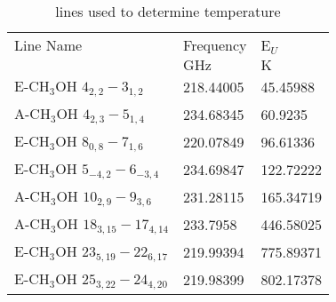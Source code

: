 \begin{table*}[htp]
\caption{\methanol lines used to determine temperature}
\begin{tabular}{lll}
\label{tab:methanol}
Line Name & Frequency & E$_U$ \\
 & $\mathrm{GHz}$ & $\mathrm{K}$ \\
\hline
E-CH$_3$OH $4_{2,2}-3_{1,2}$ & 218.44005 & 45.45988 \\
A-CH$_3$OH $4_{2,3}-5_{1,4}$ & 234.68345 & 60.9235 \\
E-CH$_3$OH $8_{0,8}-7_{1,6}$ & 220.07849 & 96.61336 \\
E-CH$_3$OH $5_{-4,2}-6_{-3,4}$ & 234.69847 & 122.72222 \\
A-CH$_3$OH $10_{2,9}-9_{3,6}$ & 231.28115 & 165.34719 \\
A-CH$_3$OH $18_{3,15}-17_{4,14}$ & 233.7958 & 446.58025 \\
E-CH$_3$OH $23_{5,19}-22_{6,17}$ & 219.99394 & 775.89371 \\
E-CH$_3$OH $25_{3,22}-24_{4,20}$ & 219.98399 & 802.17378 \\
\hline
\end{tabular}

\end{table*}
